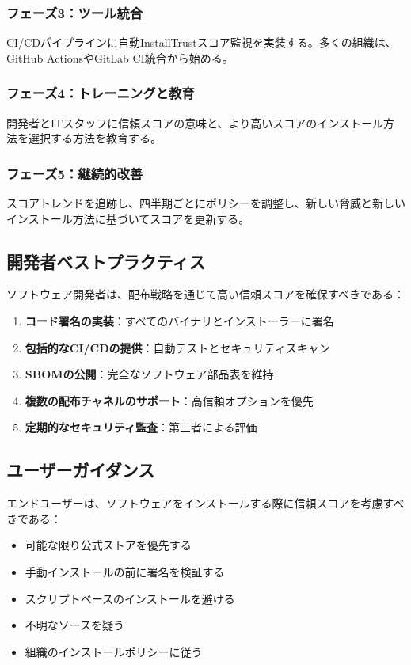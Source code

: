 \documentclass[Specialissue]{jsaiart}
\begin{document}
\subsubsection{フェーズ3：ツール統合}

CI/CDパイプラインに自動InstallTrustスコア監視を実装する。多くの組織は、GitHub ActionsやGitLab CI統合から始める。

\subsubsection{フェーズ4：トレーニングと教育}

開発者とITスタッフに信頼スコアの意味と、より高いスコアのインストール方法を選択する方法を教育する。

\subsubsection{フェーズ5：継続的改善}

スコアトレンドを追跡し、四半期ごとにポリシーを調整し、新しい脅威と新しいインストール方法に基づいてスコアを更新する。

\subsection{開発者ベストプラクティス}

ソフトウェア開発者は、配布戦略を通じて高い信頼スコアを確保すべきである：

\begin{enumerate}
    \item \textbf{コード署名の実装}：すべてのバイナリとインストーラーに署名
    \item \textbf{包括的なCI/CDの提供}：自動テストとセキュリティスキャン
    \item \textbf{SBOMの公開}：完全なソフトウェア部品表を維持
    \item \textbf{複数の配布チャネルのサポート}：高信頼オプションを優先
    \item \textbf{定期的なセキュリティ監査}：第三者による評価
\end{enumerate}

\subsection{ユーザーガイダンス}

エンドユーザーは、ソフトウェアをインストールする際に信頼スコアを考慮すべきである：

\begin{itemize}
    \item 可能な限り公式ストアを優先する
    \item 手動インストールの前に署名を検証する
    \item スクリプトベースのインストールを避ける
    \item 不明なソースを疑う
    \item 組織のインストールポリシーに従う
\end{itemize}
\end{document}
